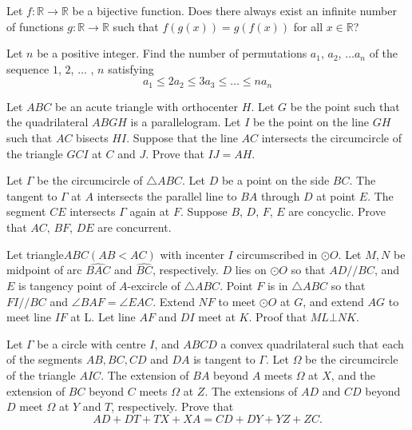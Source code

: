 \documentclass[11pt]{scrartcl}
\begin{document}
\begin{problem}[233001122289340]
Let $f:\mathbb{R}\to\mathbb{R}$ be a bijective function. Does there always exist an infinite number of functions $g:\mathbb{R}\to\mathbb{R}$ such that $f(g(x))=g(f(x))$ for all $x\in\mathbb{R}$?
\end{problem}
\begin{problem}[233559801569582]
Let $n$ be a positive integer. Find the number of permutations $a_1$, $a_2$, $\dots a_n$ of the
sequence $1$, $2$, $\dots$ , $n$ satisfying
$$a_1 \le 2a_2\le 3a_3 \le \dots \le na_n$$
\end{problem}
\begin{problem}[236181624113090]
	Let $ABC$ be an acute triangle with orthocenter $H$. Let $G$ be the point such that the quadrilateral $ABGH$ is a parallelogram. Let $I$ be the point on the line $GH$ such that $AC$ bisects $HI$. Suppose that the line $AC$ intersects the circumcircle of the triangle $GCI$ at $C$ and $J$. Prove that $IJ = AH$.
\end{problem}
\begin{problem}[236318831875052]
	Let $\Gamma$ be the circumcircle of $\triangle ABC$. Let $D$ be a point on the side $BC$. The tangent to $\Gamma$ at $A$ intersects the parallel line to $BA$ through $D$ at point $E$. The segment $CE$ intersects $\Gamma$ again at $F$. Suppose $B$, $D$, $F$, $E$ are concyclic. Prove that $AC$, $BF$, $DE$ are concurrent.
\end{problem}
\begin{problem}[239934686230450]
Let triangle$ABC(AB<AC)$ with incenter $I$ circumscribed in $\odot O$. Let $M,N$ be midpoint of arc $\widehat{BAC}$ and $\widehat{BC}$, respectively. $D$ lies on $\odot O$ so that $AD//BC$, and $E$ is tangency point of $A$-excircle of $\bigtriangleup ABC$. Point $F$ is in $\bigtriangleup ABC$ so that $FI//BC$ and $\angle BAF=\angle EAC$. Extend $NF$ to meet $\odot O$ at $G$, and extend $AG$ to meet line $IF$ at L. Let line $AF$ and $DI$ meet at $K$. Proof that $ML\bot NK$.
\end{problem}
\begin{problem}[240654526717277]
Let $\Gamma$ be a circle with centre $I$, and $A B C D$ a convex quadrilateral such that each of the segments $A B, B C, C D$ and $D A$ is tangent to $\Gamma$. Let $\Omega$ be the circumcircle of the triangle $A I C$. The extension of $B A$ beyond $A$ meets $\Omega$ at $X$, and the extension of $B C$ beyond $C$ meets $\Omega$ at $Z$. The extensions of $A D$ and $C D$ beyond $D$ meet $\Omega$ at $Y$ and $T$, respectively. Prove that\[A D+D T+T X+X A=C D+D Y+Y Z+Z C.\]
\end{problem}
\end{document}
